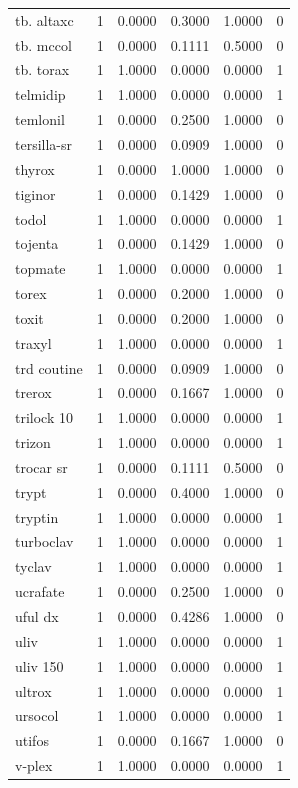 \begin{longtable}{p{3.0cm}rrrrr}
tb. altaxc & 1 & 0.0000 & 0.3000 & 1.0000 & 0 \\
tb. mccol & 1 & 0.0000 & 0.1111 & 0.5000 & 0 \\
tb. torax & 1 & 1.0000 & 0.0000 & 0.0000 & 1 \\
telmidip & 1 & 1.0000 & 0.0000 & 0.0000 & 1 \\
temlonil & 1 & 0.0000 & 0.2500 & 1.0000 & 0 \\
tersilla-sr & 1 & 0.0000 & 0.0909 & 1.0000 & 0 \\
thyrox & 1 & 0.0000 & 1.0000 & 1.0000 & 0 \\
tiginor & 1 & 0.0000 & 0.1429 & 1.0000 & 0 \\
todol & 1 & 1.0000 & 0.0000 & 0.0000 & 1 \\
tojenta & 1 & 0.0000 & 0.1429 & 1.0000 & 0 \\
topmate & 1 & 1.0000 & 0.0000 & 0.0000 & 1 \\
torex & 1 & 0.0000 & 0.2000 & 1.0000 & 0 \\
toxit & 1 & 0.0000 & 0.2000 & 1.0000 & 0 \\
traxyl & 1 & 1.0000 & 0.0000 & 0.0000 & 1 \\
trd coutine & 1 & 0.0000 & 0.0909 & 1.0000 & 0 \\
trerox & 1 & 0.0000 & 0.1667 & 1.0000 & 0 \\
trilock 10 & 1 & 1.0000 & 0.0000 & 0.0000 & 1 \\
trizon & 1 & 1.0000 & 0.0000 & 0.0000 & 1 \\
trocar sr & 1 & 0.0000 & 0.1111 & 0.5000 & 0 \\
trypt & 1 & 0.0000 & 0.4000 & 1.0000 & 0 \\
tryptin & 1 & 1.0000 & 0.0000 & 0.0000 & 1 \\
turboclav & 1 & 1.0000 & 0.0000 & 0.0000 & 1 \\
tyclav & 1 & 1.0000 & 0.0000 & 0.0000 & 1 \\
ucrafate & 1 & 0.0000 & 0.2500 & 1.0000 & 0 \\
uful dx & 1 & 0.0000 & 0.4286 & 1.0000 & 0 \\
uliv & 1 & 1.0000 & 0.0000 & 0.0000 & 1 \\
uliv 150 & 1 & 1.0000 & 0.0000 & 0.0000 & 1 \\
ultrox & 1 & 1.0000 & 0.0000 & 0.0000 & 1 \\
ursocol & 1 & 1.0000 & 0.0000 & 0.0000 & 1 \\
utifos & 1 & 0.0000 & 0.1667 & 1.0000 & 0 \\
v-plex & 1 & 1.0000 & 0.0000 & 0.0000 & 1 \\

\end{longtable}
